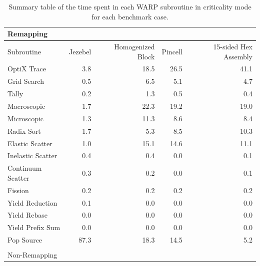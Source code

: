 \begin{table}[h!]
\centering
\caption{Summary table of the time spent in each WARP subroutine in criticality mode for each benchmark case.}
\label{profile_summary}
\begin{tabular}{| l | r  | r | r | r |}
\multicolumn{5}{l}{Remapping} \\
 \hline
 Subroutine        & Jezebel & Homogenized Block & Pincell & 15-sided Hex Assembly  \\
 \hline \hline
 OptiX Trace       & 3.8       &    18.5                        &   26.5    &      41.1    \\ \hline
 Grid Search       & 0.5       &    6.5                         &   5.1       &      4.7       \\ \hline
 Tally                   & 0.2       &    1.3                         &   0.5       &      0.4       \\ \hline
 Macroscopic      & 1.7       &   22.3                        &   19.2      &     19.0     \\ \hline
 Microscopic       & 1.3       &    11.3                        &  8.6        &      8.4       \\ \hline
 Radix Sort         & 1.7       &     5.3                         &   8.5       &      10.3     \\ \hline
 Elastic Scatter   & 1.0       &     15.1                       &   14.6    &      11.1    \\ \hline
 Inelastic Scatter & 0.4       &     0.4                         &   0.0      &       0.1   \\ \hline
 Continuum Scatter & 0.3   &     0.2                         &   0.0      &       0.1   \\ \hline
 Fission               & 0.2       &      0.2                        &   0.2      &       0.2     \\ \hline
 Yield Reduction  & 0.1       &      0.0                        &   0.0     &       0.0    \\ \hline
 Yield Rebase     & 0.0        &     0.0                         &   0.0     &       0.0   \\ \hline
 Yield Prefix Sum &  0.0       &    0.0                         &   0.0     &       0.0   \\ \hline
 Pop Source         &  87.3     &    18.3                       &   14.5   &      5.2    \\ 
\hline
\multicolumn{5}{l}{} \\
\multicolumn{5}{l}{Non-Remapping} \\

\end{tabular}
\end{table}
